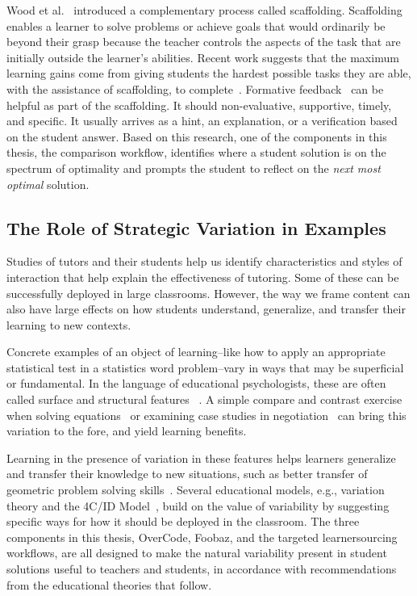 Wood et al.~\cite{woodscaffolding} introduced a complementary process called scaffolding. Scaffolding enables a learner to solve problems or achieve goals that would ordinarily be beyond their grasp because the teacher controls the aspects of the task that are initially outside the learner's abilities. Recent work suggests that the maximum learning gains come from giving students the hardest possible tasks they are able, with the assistance of scaffolding, to complete~\cite{zpd14}. Formative feedback~\cite{formative} can be helpful as part of the scaffolding. It should non-evaluative, supportive, timely, and specific. It usually arrives as a hint, an explanation, or a verification based on the student answer. Based on this research, one of the components in this thesis, the comparison workflow, identifies where a student solution is on the spectrum of optimality and prompts the student to reflect on the {\it next most optimal} solution.

\subsection{The Role of Strategic Variation in Examples}

Studies of tutors and their students help us identify characteristics and styles of interaction that help explain the effectiveness of tutoring. Some of these can be successfully deployed in large classrooms. However, the way we frame content can also have large effects on how students understand, generalize, and transfer their learning to new contexts.

Concrete examples of an object of learning--like how to apply an appropriate statistical test in a statistics word problem--vary in ways that may be superficial or fundamental. In the language of educational psychologists, these are often called surface and structural features ~\cite{quilicimayer}. A simple compare and contrast exercise when solving equations~\cite{rittle2007does} or examining case studies in negotiation~\cite{loewenstein2003analogical} can bring this variation to the fore, and yield learning benefits.

Learning in the presence of variation in these features helps learners generalize and transfer their knowledge to new situations, such as better transfer of geometric problem solving skills~\cite{workedexamplesvariability,Variabilityofpractice}. Several educational models, e.g., variation theory and the 4C/ID Model~\cite{van2002blueprints}, build on the value of variability by suggesting specific ways for how it should be deployed in the classroom. The three components in this thesis, OverCode, Foobaz, and the targeted learnersourcing workflows, are all designed to make the natural variability present in student solutions useful to teachers and students, in accordance with recommendations from the educational theories that follow.

